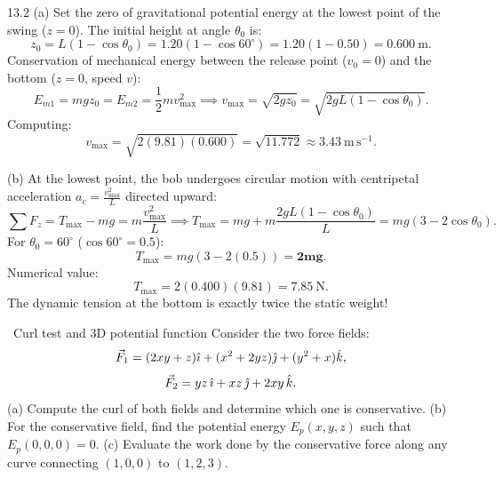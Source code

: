 \begin{solution}{13.2}
(a) Set the zero of gravitational potential energy at the lowest point of the swing ($z = 0$).
The initial height at angle $\theta_0$ is:
\[
z_0 = L(1 - \cos\theta_0) = 1.20(1 - \cos 60^\circ) = 1.20(1 - 0.50) = 0.600\ \mathrm{m}.
\]
Conservation of mechanical energy between the release point ($v_0 = 0$) and the bottom ($z = 0$, speed $v$):
\[
E_{m1} = mg z_0 = E_{m2} = \frac{1}{2}m v_{\max}^2 \implies v_{\max} = \sqrt{2g z_0} = \sqrt{2gL(1 - \cos\theta_0)}.
\]
Computing:
\[
v_{\max} = \sqrt{2(9.81)(0.600)} = \sqrt{11.772} \approx \mathbf{3.43\ \mathrm{m\,s^{-1}}.}
\]

(b) At the lowest point, the bob undergoes circular motion with centripetal acceleration $a_c = \frac{v_{\max}^2}{L}$ directed upward:
\[
\sum F_z = T_{\max} - mg = m\frac{v_{\max}^2}{L} \implies T_{\max} = mg + m\frac{2gL(1 - \cos\theta_0)}{L} = mg(3 - 2\cos\theta_0).
\]
For $\theta_0 = 60^\circ$ ($\cos 60^\circ = 0.5$):
\[
T_{\max} = mg(3 - 2(0.5)) = \mathbf{2mg.}
\]
Numerical value:
\[
T_{\max} = 2(0.400)(9.81) = \mathbf{7.85\ \mathrm{N}.}
\]
The dynamic tension at the bottom is exactly twice the static weight!
\end{solution}

\begin{exercise}{\core\ Curl test and 3D potential function}
Consider the two force fields:
\[
\vec{F}_1 = (2xy + z)\hat{\imath} + (x^2 + 2yz)\hat{\jmath} + (y^2 + x)\hat{k},
\]
\[
\vec{F}_2 = yz\,\hat{\imath} + xz\,\hat{\jmath} + 2xy\,\hat{k}.
\]
(a) Compute the curl of both fields and determine which one is conservative.
(b) For the conservative field, find the potential energy $E_p(x, y, z)$ such that $E_p(0, 0, 0) = 0$.
(c) Evaluate the work done by the conservative force along any curve connecting $(1, 0, 0)$ to $(1, 2, 3)$.
\end{exercise}

\begin{tabletworkspace}[6.5cm]
\end{tabletworkspace}

